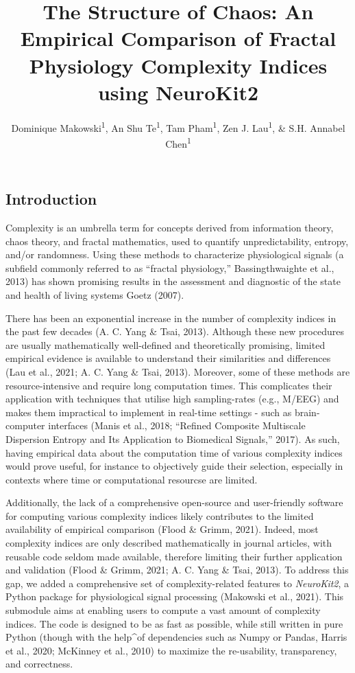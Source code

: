 \documentclass[
  man]{apa6}
\title{\textbf{The Structure of Chaos: An Empirical Comparison of Fractal Physiology Complexity Indices using NeuroKit2}}
\author{Dominique Makowski\textsuperscript{1}, An Shu Te\textsuperscript{1}, Tam Pham\textsuperscript{1}, Zen J. Lau\textsuperscript{1}, \& S.H. Annabel Chen\textsuperscript{1}}
\date{}
\affiliation{\vspace{0.5cm}\textsuperscript{1} Nanyang Technological University}
\begin{document}
\maketitle

\hypertarget{introduction}{%
\subsection{Introduction}\label{introduction}}

Complexity is an umbrella term for concepts derived from information theory, chaos theory, and fractal mathematics, used to quantify unpredictability, entropy, and/or randomness. Using these methods to characterize physiological signals (a subfield commonly referred to as ``fractal physiology,'' Bassingthwaighte et al., 2013) has shown promising results in the assessment and diagnostic of the state and health of living systems Goetz (2007).

There has been an exponential increase in the number of complexity indices in the past few decades (A. C. Yang \& Tsai, 2013). Although these new procedures are usually mathematically well-defined and theoretically promising, limited empirical evidence is available to understand their similarities and differences (Lau et al., 2021; A. C. Yang \& Tsai, 2013). Moreover, some of these methods are resource-intensive and require long computation times. This complicates their application with techniques that utilise high sampling-rates (e.g., M/EEG) and makes them impractical to implement in real-time settings - such as brain-computer interfaces (Manis et al., 2018; {``Refined Composite Multiscale Dispersion Entropy and Its Application to Biomedical Signals,''} 2017). As such, having empirical data about the computation time of various complexity indices would prove useful, for instance to objectively guide their selection, especially in contexts where time or computational resourcse are limited.

Additionally, the lack of a comprehensive open-source and user-friendly software for computing various complexity indices likely contributes to the limited availability of empirical comparison (Flood \& Grimm, 2021). Indeed, most complexity indices are only described mathematically in journal articles, with reusable code seldom made available, therefore limiting their further application and validation (Flood \& Grimm, 2021; A. C. Yang \& Tsai, 2013). To address this gap, we added a comprehensive set of complexity-related features to \emph{NeuroKit2}, a Python package for physiological signal processing (Makowski et al., 2021). This submodule aims at enabling users to compute a vast amount of complexity indices. The code is designed to be as fast as possible, while still written in pure Python (though with the help\^{}of dependencies such as Numpy or Pandas, Harris et al., 2020; McKinney et al., 2010) to maximize the re-usability, transparency, and correctness.
\end{document}
